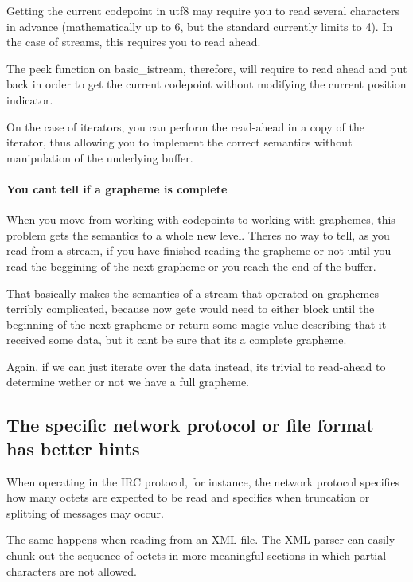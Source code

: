 Getting the current \textquotesingle{}codepoint\textquotesingle{} in utf8 may require you to read several characters in advance (mathematically up to 6, but the standard currently limits to 4). In the case of streams, this requires you to read ahead.

The \textquotesingle{}peek\textquotesingle{} function on basic\+\_\+istream, therefore, will require to read ahead and put back in order to get the current codepoint without modifying the current position indicator.

On the case of iterators, you can perform the read-\/ahead in a copy of the iterator, thus allowing you to implement the correct semantics without manipulation of the underlying buffer.

\paragraph*{You can\textquotesingle{}t tell if a grapheme is complete}

When you move from working with \textquotesingle{}codepoints\textquotesingle{} to working with graphemes, this problem gets the semantics to a whole new level. There\textquotesingle{}s no way to tell, as you read from a stream, if you have finished reading the grapheme or not until you read the beggining of the next grapheme or you reach the end of the buffer.

That basically makes the semantics of a stream that operated on graphemes terribly complicated, because now getc would need to either block until the beginning of the next grapheme or return some magic value describing that it received some data, but it can\textquotesingle{}t be sure that it\textquotesingle{}s a complete grapheme.

Again, if we can just iterate over the data instead, it\textquotesingle{}s trivial to read-\/ahead to determine wether or not we have a full grapheme.

\subsection*{The specific network protocol or file format has better hints}

When operating in the I\+RC protocol, for instance, the network protocol specifies how many octets are expected to be read and specifies when truncation or splitting of messages may occur.

The same happens when reading from an X\+ML file. The X\+ML parser can easily chunk out the sequence of octets in more meaningful sections in which partial characters are not allowed.

